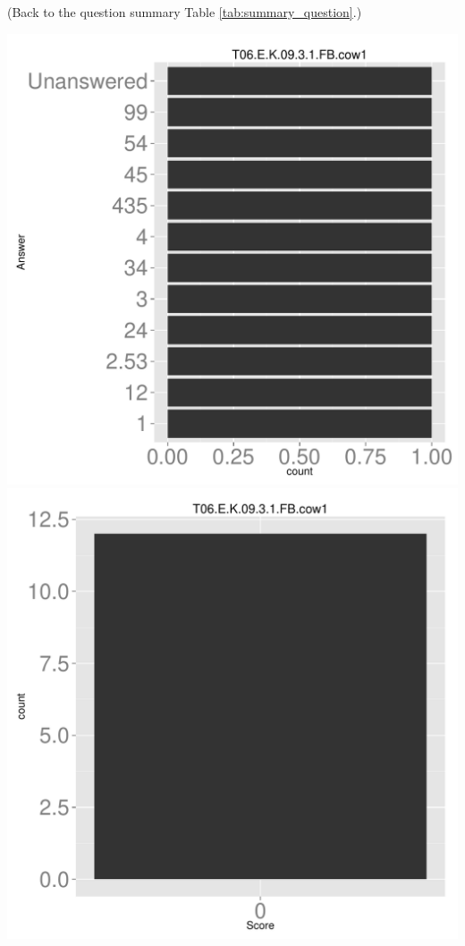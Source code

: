 \documentclass[12pt,english,nohyper]{tufte-handout}\usepackage[]{graphicx}\usepackage[]{color}
\begin{document}
 (Back to the question summary Table \ref{tab:summary_question}.)

\begin{center} \includegraphics[width=.45\linewidth]{Topic06_AB_30_answer} \includegraphics[width=.45\linewidth]{Topic06_AB_30_score} \end{center} 
\end{document}
